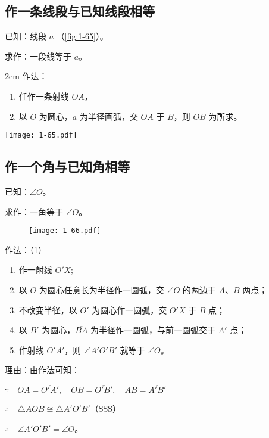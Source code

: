 \subsection{作一条线段与已知线段相等}
已知：线段 $a$ （\cref{fig:1-65}）。

求作：一段线等于 $a$。

\medskip\noindent
\begin{minipage}{0.5\linewidth}\parindent2em
	作法：
	\begin{enumerate}
		\item 任作一条射线 $OA$，
		\item 以 $O$ 为圆心，$a$ 为半径画弧，交 $OA$ 于 $B$，则 $OB$ 为所求。
	\end{enumerate}
\end{minipage}%
\begin{minipage}{0.5\linewidth}
	\centering
	\texttt{[image: 1-65.pdf]}
	\label{fig:1-65}
\end{minipage}%

\subsection{作一个角与已知角相等}
已知：$\angle O$。

求作：一角等于 $\angle O$。
\begin{figure}
	\centering
  \texttt{[image: 1-66.pdf]}
	\caption{}\label{fig:1-66}
\end{figure}

作法：（\cref{fig:1-66}）
\begin{enumerate}
	\item 作一射线 $O'X$;
	\item 以 $O$ 为圆心任意长为半径作一圆弧，交 $\angle O$ 的两边于 $A$、$B$ 两点；
	\item 不改变半径，以 $O'$ 为圆心作一圆弧，交 $O'X$ 于 $B$	点；
	\item 以 $B'$ 为圆心，$\overline{BA}$ 为半径作一圆弧，与前一圆弧交于 $A'$ 点；
	\item 作射线 $O'A'$，则 $\angle A'O'B'$ 就等于 $\angle O$。
\end{enumerate}

理由：由作法可知：

$\because\quad \overline{OA}=\overline{O'A'},\quad \overline{OB}=\overline{O'B'},\quad \overline{AB}=\overline{A'B'}$

$\therefore\quad \triangle AOB\cong \triangle A'O'B'$（SSS）

$\therefore\quad \angle A'O'B'=\angle O$。

